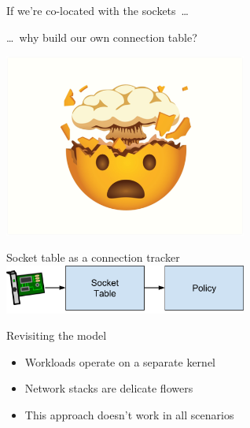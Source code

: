 \documentclass[black,white]{beamer}
\begin{document}
    \begin{frame}{If we're co-located with the sockets~\ldots}
        \begin{flushright}
            \ldots~why build our own connection table? \medskip
        \end{flushright}
	\begin{center}
        \includegraphics[width=0.6\textwidth]{mindblown.png}
	\end{center}
    \end{frame}

    \begin{frame}[fragile]{Socket table as a connection tracker}
        \centering
        \vfill
        \includegraphics[width=0.6\textwidth]{sfw-sk-policy.png}
        \vfill
    \end{frame}

    \begin{frame}{Revisiting the model}
	\begin{itemize}
            \item Workloads operate on a separate kernel \bigskip
            \item Network stacks are delicate flowers \bigskip
            \item This approach doesn't work in all scenarios \bigskip
	\end{itemize}
    \end{frame}
\end{document}
